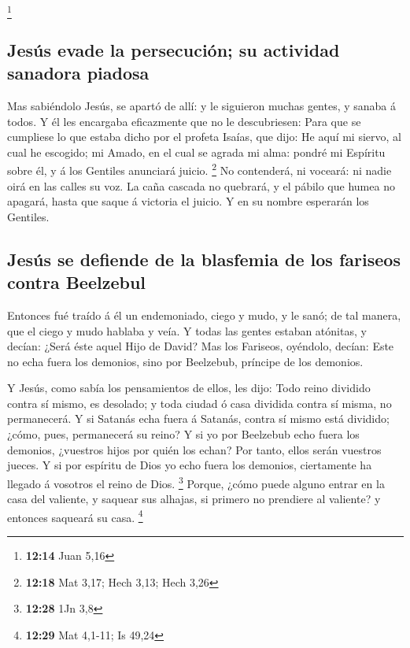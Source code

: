 \footnote{\textbf{12:14} Juan 5,16}

\hypertarget{jesuxfas-evade-la-persecuciuxf3n-su-actividad-sanadora-piadosa}{%
\subsection{Jesús evade la persecución; su actividad sanadora
piadosa}\label{jesuxfas-evade-la-persecuciuxf3n-su-actividad-sanadora-piadosa}}

 Mas sabiéndolo Jesús, se apartó de allí: y le siguieron
muchas gentes, y sanaba á todos.  Y él les encargaba
eficazmente que no le descubriesen:  Para que se cumpliese
lo que estaba dicho por el profeta Isaías, que dijo:  He
aquí mi siervo, al cual he escogido; mi Amado, en el cual se agrada mi
alma: pondré mi Espíritu sobre él, y á los Gentiles anunciará juicio.
\footnote{\textbf{12:18} Mat 3,17; Hech 3,13; Hech 3,26} 
No contenderá, ni voceará: ni nadie oirá en las calles su voz.
 La caña cascada no quebrará, y el pábilo que humea no
apagará, hasta que saque á victoria el juicio.  Y en su
nombre esperarán los Gentiles.

\hypertarget{jesuxfas-se-defiende-de-la-blasfemia-de-los-fariseos-contra-beelzebul}{%
\subsection{Jesús se defiende de la blasfemia de los fariseos contra
Beelzebul}\label{jesuxfas-se-defiende-de-la-blasfemia-de-los-fariseos-contra-beelzebul}}

 Entonces fué traído á él un endemoniado, ciego y mudo, y
le sanó; de tal manera, que el ciego y mudo hablaba y veía.
 Y todas las gentes estaban atónitas, y decían: ¿Será éste
aquel Hijo de David?  Mas los Fariseos, oyéndolo, decían:
Este no echa fuera los demonios, sino por Beelzebub, príncipe de los
demonios.

 Y Jesús, como sabía los pensamientos de ellos, les dijo:
Todo reino dividido contra sí mismo, es desolado; y toda ciudad ó casa
dividida contra sí misma, no permanecerá.  Y si Satanás
echa fuera á Satanás, contra sí mismo está dividido; ¿cómo, pues,
permanecerá su reino?  Y si yo por Beelzebub echo fuera los
demonios, ¿vuestros hijos por quién los echan? Por tanto, ellos serán
vuestros jueces.  Y si por espíritu de Dios yo echo fuera
los demonios, ciertamente ha llegado á vosotros el reino de Dios.
\footnote{\textbf{12:28} 1Jn 3,8}  Porque, ¿cómo puede
alguno entrar en la casa del valiente, y saquear sus alhajas, si primero
no prendiere al valiente? y entonces saqueará su casa. \footnote{\textbf{12:29}
  Mat 4,1-11; Is 49,24}

